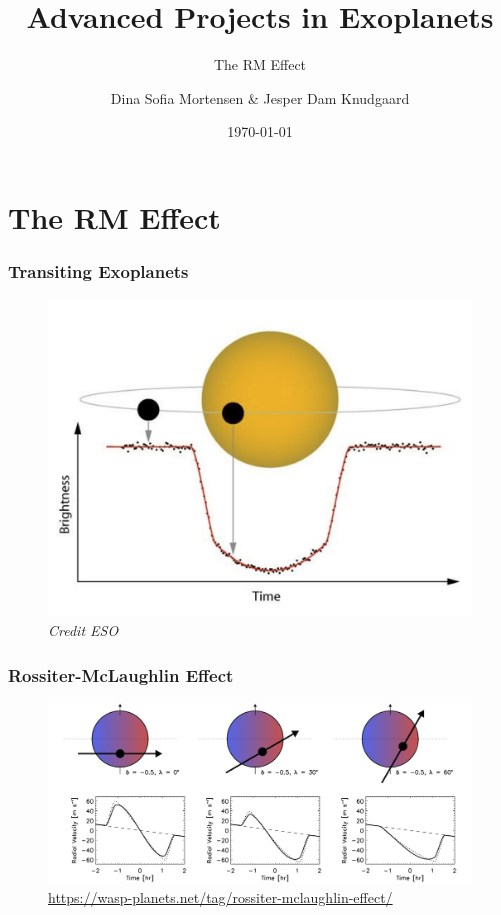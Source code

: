 \documentclass[show notes]{beamer}
\title{Advanced Projects in Exoplanets}
\subtitle{The RM Effect}
\author{Dina Sofia Mortensen \& Jesper Dam Knudgaard}
\institute{Stellar Astrophysics Centre, Aarhus University}
\date{\today}
\begin{document}
\begin{frame}
\titlepage
\end{frame}

\section{The RM Effect}

\begin{frame}
\frametitle{Transiting Exoplanets}
	\begin{figure}
		\centering
		\includegraphics[width = 0.7\columnwidth]{../figures/Transit.jpg}
		\caption{\textit{Credit ESO}}
		\label{fig:transit} 
	\end{figure}
\end{frame}

\begin{frame}
\frametitle{Rossiter-McLaughlin Effect}
	\begin{figure}
		\centering
		\includegraphics[width=\textwidth]{../figures/winnwhites.jpg}
		\caption{\url{https://wasp-planets.net/tag/rossiter-mclaughlin-effect/}}
		\label{fig:rm_effect}
	\end{figure}
\end{frame}

\end{document}
